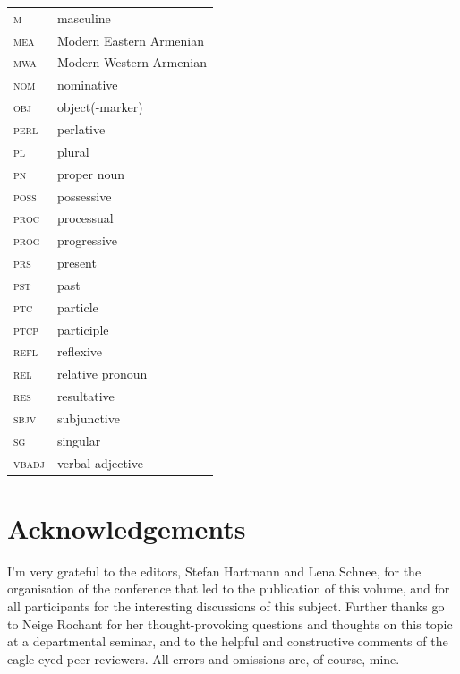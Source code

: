\documentclass[output=paper,colorlinks,citecolor=brown]{langscibook}
\begin{document}
	\begin{tabularx}{.5\textwidth}{@{}lQ@{}}
		\textsc{m} & masculine\\
		\textsc{\textsc{mea}} & Modern Eastern Armenian\\
		\textsc{\textsc{mwa}} & Modern Western Armenian\\
		\textsc{nom} & nominative \\
		\textsc{obj} & object(-marker)\\
		\textsc{perl} & perlative\\
		\textsc{pl} & plural \\
		\textsc{pn} & proper noun\\
		\textsc{poss} & possessive\\
		\textsc{proc} & processual\\
		\textsc{prog} & progressive\\
		\textsc{prs} & present\\
		\textsc{pst} & past\\
		\textsc{ptc} & particle\\
		\textsc{ptcp} & participle\\
		\textsc{refl} & reflexive\\
		\textsc{rel} & relative pronoun\\
		\textsc{res} & resultative\\
		\textsc{sbjv} & subjunctive\\
		\textsc{sg} & singular\\
		\textsc{vbadj} & verbal adjective\\
	\end{tabularx}
	
	\section*{Acknowledgements}
	I'm very grateful to the editors, Stefan Hartmann and Lena Schnee, for the organisation of the conference that led to the publication of this volume, and for all participants for the interesting discussions of this subject. Further thanks go to Neige Rochant for her thought-provoking questions and thoughts on this topic at a departmental seminar, and to the helpful and constructive comments of the eagle-eyed peer-reviewers. All errors and omissions are, of course, mine.
	
	\sloppy
	\printbibliography[heading=subbibliography,notkeyword=this]
\end{document}

